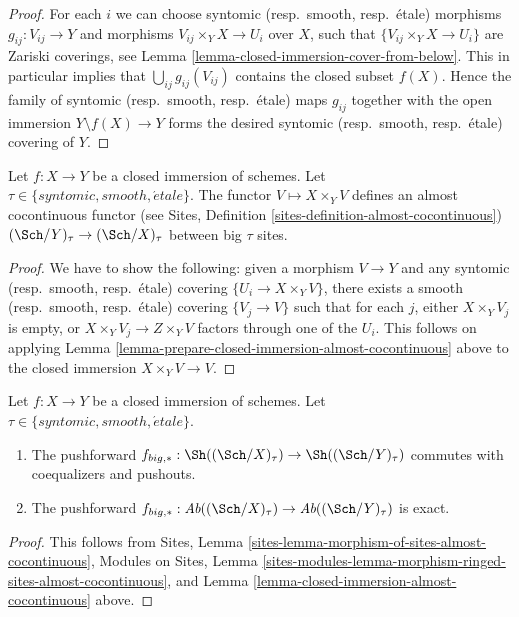 \begin{proof}
For each $i$ we can choose syntomic (resp.\ smooth, resp.\ \'etale) morphisms
$g_{ij} : V_{ij} \to Y$ and morphisms $V_{ij} \times_Y X \to U_i$ over $X$,
such that $\{V_{ij} \times_Y X \to U_i\}$ are Zariski coverings, see
Lemma \ref{lemma-closed-immersion-cover-from-below}.
This in particular implies that
$\bigcup_{ij} g_{ij}(V_{ij})$ contains the closed subset $f(X)$.
Hence the family of syntomic (resp.\ smooth, resp.\ \'etale) maps $g_{ij}$
together with the open immersion $Y \setminus f(X) \to Y$ forms the desired
syntomic (resp.\ smooth, resp.\ \'etale) covering of $Y$.
\end{proof}

\begin{lemma}
\label{lemma-closed-immersion-almost-cocontinuous}
Let $f : X \to Y$ be a closed immersion of schemes.
Let $\tau \in \{syntomic, smooth, \acute{e}tale\}$.
The functor $V \mapsto X \times_Y V$ defines an almost
cocontinuous functor (see
Sites, Definition \ref{sites-definition-almost-cocontinuous})
$(\Sch/Y)_\tau \to (\Sch/X)_\tau$ between
big $\tau$ sites.
\end{lemma}

\begin{proof}
We have to show the following: given a morphism $V \to Y$
and any syntomic (resp.\ smooth, resp.\ \'etale)
covering $\{U_i \to X \times_Y V\}$, there exists a
smooth (resp.\ smooth, resp.\ \'etale) covering $\{V_j \to V\}$
such that for each $j$, either $X \times_Y V_j$ is empty, or
$X \times_Y V_j \to Z \times_Y V$ factors through one of
the $U_i$. This follows on applying
Lemma \ref{lemma-prepare-closed-immersion-almost-cocontinuous}
above to the closed immersion $X \times_Y V \to V$.
\end{proof}

\begin{lemma}
\label{lemma-closed-immersion-pushforward-exact}
Let $f : X \to Y$ be a closed immersion of schemes.
Let $\tau \in \{syntomic, smooth, \acute{e}tale\}$.
\begin{enumerate}
\item The pushforward
$f_{big, *} :
\Sh((\Sch/X)_\tau)
\to
\Sh((\Sch/Y)_\tau)$
commutes with coequalizers and pushouts.
\item The pushforward
$f_{big, *} :
\textit{Ab}((\Sch/X)_\tau)
\to
\textit{Ab}((\Sch/Y)_\tau)$
is exact.
\end{enumerate}
\end{lemma}

\begin{proof}
This follows from
Sites, Lemma \ref{sites-lemma-morphism-of-sites-almost-cocontinuous},
Modules on Sites,
Lemma \ref{sites-modules-lemma-morphism-ringed-sites-almost-cocontinuous},
and
Lemma \ref{lemma-closed-immersion-almost-cocontinuous}
above.
\end{proof}

